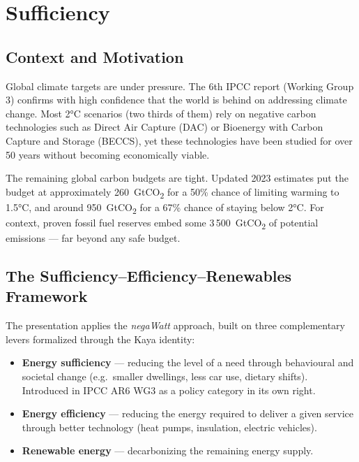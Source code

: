 \chapter{Sufficiency}

\section{Context and Motivation}

Global climate targets are under pressure. The 6th IPCC report (Working Group 3)
confirms with high confidence that the world is behind on addressing climate change.
Most 2°C scenarios (two thirds of them) rely on negative carbon technologies such as
Direct Air Capture (DAC) or Bioenergy with Carbon Capture and Storage (BECCS), yet
these technologies have been studied for over 50 years without becoming economically
viable.

The remaining global carbon budgets are tight. Updated 2023 estimates put the budget
at approximately 260~GtCO\textsubscript{2} for a 50\% chance of limiting warming to
1.5°C, and around 950~GtCO\textsubscript{2} for a 67\% chance of staying below 2°C.
For context, proven fossil fuel reserves embed some 3\,500~GtCO\textsubscript{2} of
potential emissions --- far beyond any safe budget.

\section{The Sufficiency--Efficiency--Renewables Framework}

The presentation applies the \emph{negaWatt} approach, built on three complementary
levers formalized through the Kaya identity:

\begin{itemize}[noitemsep]
    \item \textbf{Energy sufficiency} --- reducing the level of a need through
          behavioural and societal change (e.g.\ smaller dwellings, less car use,
          dietary shifts). Introduced in IPCC AR6 WG3 as a policy category in its
          own right.
    \item \textbf{Energy efficiency} --- reducing the energy required to deliver a
          given service through better technology (heat pumps, insulation,
          electric vehicles).
    \item \textbf{Renewable energy} --- decarbonizing the remaining energy supply.
\end{itemize}

